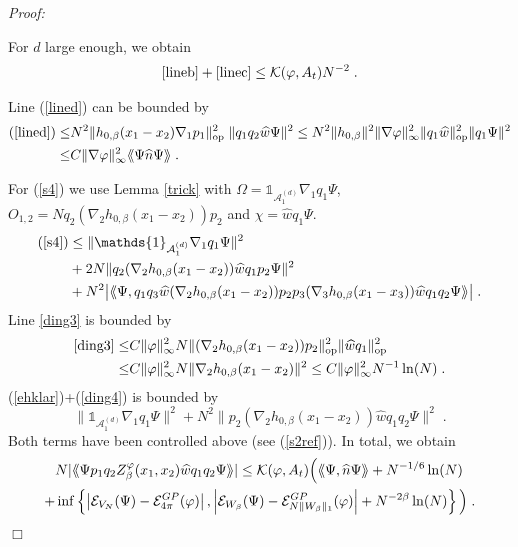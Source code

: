 \documentclass[11pt, english, american]{article}
\newcommand{\laa}{\langle\hspace{-0.08cm}\langle}
\newcommand{\raa}{\rangle\hspace{-0.08cm}\rangle}
\newenvironment{proof}{\emph{Proof:}}{\begin{flushright} $ \Box $ \end{flushright}}
\renewcommand{\phi}{\varphi}
\newcommand{\potdiff}{Z}
\begin{document}
\begin{proof}
\begin{enumerate}
For $d$ large enough, we obtain 
\begin{align*}
\eqref{lineb}+\eqref{linec}
\leq
 \mathcal{K}(\phi, A_t)
N^{-2}
\;.
\end{align*}

Line (\ref{lined}) can be bounded by
\begin{align*}
(\ref{lined})\leq&N^2\|h_{0,\beta}(x_1-x_2)\nabla_1p_1\|_{\text{op}}^2\;\|q_1q_2\widehat{w}\Psi\|^2
%
\leq
N^2\|h_{0,\beta}\|^2 \| \nabla \phi \|_\infty^2  \| q_1 \widehat{w} \|_{\text{op}}^2
\|q_1 \Psi \|^2
\\ 
\leq& C
 \| \nabla \phi \|_\infty^2
\laa\Psi\widehat{n}\Psi\raa
\;.
\end{align*}




For (\ref{s4}) we use Lemma \ref{trick} with $\Omega=\mathds{1}_{\mathcal{A}^{(d)}_{1}}\nabla_1q_1\Psi$,\\
$O_{1,2}=Nq_2(\nabla_2
h_{0,\beta}(x_1-x_2))p_2$ and $\chi=\widehat{w}q_1\Psi$.
\begin{align} 
(\ref{s4})&\leq \|\mathds{1}_{\mathcal{A}^{(d)}_{1}}\nabla_1q_1\Psi\|^2\label{ehklar}\\
&+
\label{ding3}
2 N\|q_2(\nabla_2
h_{0,\beta}(x_1-x_2))\widehat{w}q_1p_2\Psi\|^2
%
\\\label{ding4}&+N^2\big|\laa \Psi,q_1q_3\widehat{w}(\nabla_2
h_{0,\beta}(x_1-x_2))
%
p_2p_3(\nabla_3
h_{0,\beta}(x_1-x_3))\widehat{w}q_1q_2\Psi\raa\big|
\;.
\end{align}
Line \eqref{ding3} is bounded by
\begin{align*}
\eqref{ding3}
\leq &
C
 \|  \phi \|_\infty^2
N 
\|(\nabla_2 h_{0,\beta}(x_1-x_2))p_2 \|_{\text{op}}^2
\|\widehat{w}q_1\|_{\text{op}}^2
\\
\leq &
 C  \|  \phi \|_\infty^2 N 
\|\nabla_2 h_{0,\beta}(x_1-x_2) \|^2
\leq
C  \| \phi \|_\infty^2 N^{-1} \ln(N)
\;.
\end{align*}
(\ref{ehklar})+(\ref{ding4}) is bounded by $$
\|\mathds{1}_{\mathcal{A}^{(d)}_{1}}\nabla_1q_1\Psi\|^2+N^2\| p_2 (\nabla_2
h_{0,\beta}(x_1-x_2))\widehat{w}q_1 q_2\Psi\|^2\;.$$
Both terms have been controlled above (see (\ref{s2ref})). In total, we obtain
\begin{align*} &N|\laa\Psi p_1q_2\potdiff^\phi_\beta(x_1,x_2)\widehat{w}q_1q_2\Psi\raa|
\leq 
\mathcal{K}(\phi,A_t)
\Big(
\laa\Psi,\widehat{n}\Psi\raa+ N^{-1/6} \ln(N)
\\
+&
\inf \left\lbrace 
\left|\mathcal{E}_{V_N}(\Psi)-\mathcal{E}_{4 \pi}^{GP}(\phi)\right|,
\left|\mathcal{E}_{W_\beta}(\Psi)-\mathcal{E}_{N \|W_\beta\|_1}^{GP}(\phi)\right|+ N^{-2 \beta} \ln(N)
\right\rbrace
\Big)
\;.
\end{align*}






 
\end{enumerate}
\end{proof}
\end{document}

